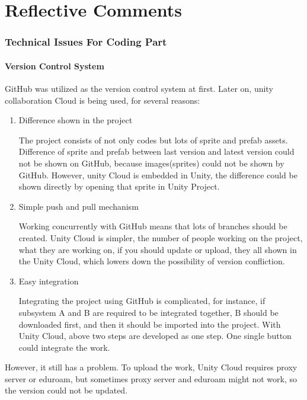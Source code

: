 \documentclass[12pt, a4paper]{report}
\author{Minghao Wang 16522066}
\begin{document}
\part{Reflective Comments}
	\section{Technical Issues For Coding Part}
		\subsection{Version Control System}
			GitHub was utilized as the version control system at first. Later on, unity collaboration Cloud is being used, for several reasons:\\
			\begin{enumerate}
				\item Difference shown in the project

				The project consists of not only codes but lots of sprite and prefab assets. Difference of sprite and prefab between last version and latest version could not be shown on GitHub,  because images(sprites) could not be shown by GitHub. However, unity Cloud is embedded in Unity, the difference could be shown directly by opening that sprite in Unity Project.\\


				\item Simple push and pull mechanism

				Working concurrently with GitHub means that lots of branches should be created. Unity Cloud is simpler, the number of people working on the project, what they are working on, if you should update or upload, they all shown in the Unity Cloud, which lowers down the possibility of version confliction.\\

				\item Easy integration 

				Integrating the project using GitHub is complicated, for instance, if subsystem A and B are required to be integrated together, B should be downloaded first, and then it should be imported into the project. With Unity Cloud, above two steps are developed as one step. One single button could integrate the work. \\
			\end{enumerate}
			However, it still has a problem. To upload the work, Unity Cloud requires proxy server or eduroam, but sometimes proxy server and eduroam might not work, so the version could not be updated.
\end{document}

